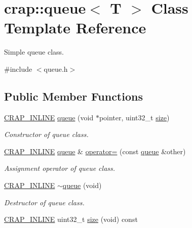 \hypertarget{classcrap_1_1queue}{}\section{crap\+:\+:queue$<$ T $>$ Class Template Reference}
\label{classcrap_1_1queue}


Simple queue class.  




{\ttfamily \#include $<$queue.\+h$>$}

\subsection*{Public Member Functions}
\begin{DoxyCompactItemize}
\item 
\hyperlink{config__x86_8h_a5a40526b8d842e7ff731509998bb0f1c}{C\+R\+A\+P\+\_\+\+I\+N\+L\+I\+N\+E} \hyperlink{classcrap_1_1queue_ad4e0b0eb26d52a375dd0d03c94c77521}{queue} (void $\ast$pointer, uint32\+\_\+t \hyperlink{classcrap_1_1queue_a73fca132c007c2090336b0ab077bfe82}{size})
\begin{DoxyCompactList}\small\item\em Constructor of queue class. \end{DoxyCompactList}\item 
\hyperlink{config__x86_8h_a5a40526b8d842e7ff731509998bb0f1c}{C\+R\+A\+P\+\_\+\+I\+N\+L\+I\+N\+E} \hyperlink{classcrap_1_1queue}{queue} \& \hyperlink{classcrap_1_1queue_a4379fd9831fc06b89a8fdea7c790bc4c}{operator=} (const \hyperlink{classcrap_1_1queue}{queue} \&other)
\begin{DoxyCompactList}\small\item\em Assignment operator of queue class. \end{DoxyCompactList}\item 
\hyperlink{config__x86_8h_a5a40526b8d842e7ff731509998bb0f1c}{C\+R\+A\+P\+\_\+\+I\+N\+L\+I\+N\+E} \hyperlink{classcrap_1_1queue_a9289cb92cd6a64280ea848dc88b0a6f9}{$\sim$queue} (void)
\begin{DoxyCompactList}\small\item\em Destructor of queue class. \end{DoxyCompactList}\item 
\hyperlink{config__x86_8h_a5a40526b8d842e7ff731509998bb0f1c}{C\+R\+A\+P\+\_\+\+I\+N\+L\+I\+N\+E} uint32\+\_\+t \hyperlink{classcrap_1_1queue_a73fca132c007c2090336b0ab077bfe82}{size} (void) const 
\item 

\end{DoxyCompactItemize}
